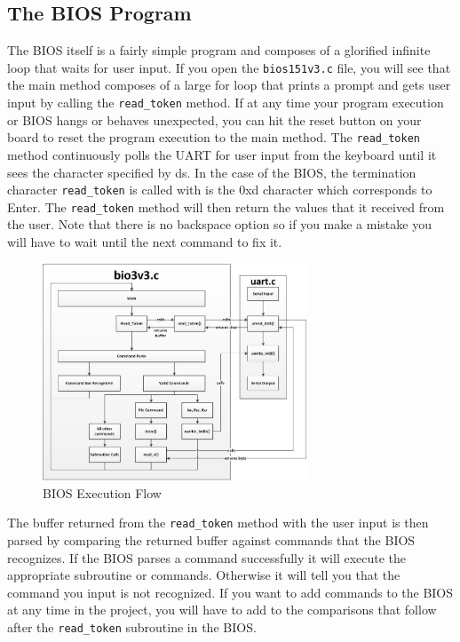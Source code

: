 \documentclass[11pt]{article}
\begin{document}
\begin{appendices}
\subsection{The BIOS Program}
The BIOS itself is a fairly simple program and composes of a glorified infinite loop that waits for
user input. If you open the \verb|bios151v3.c| file, you will see that the main method composes of a
large for loop that prints a prompt and gets user input by calling the \verb|read_token| method.
If at any time your program execution or BIOS hangs or behaves unexpected, you can hit the
reset button on your board to reset the program execution to the main method.
The \verb|read_token| method continuously polls the UART for user input from the keyboard until it
sees the character specified by ds. In the case of the BIOS, the termination character
\verb|read_token| is called with is the 0xd character which corresponds to Enter.
The \verb|read_token| method will then return the values that it received from the user. Note that
there is no backspace option so if you make a mistake you will have to wait until the next
command to fix it.

\begin{figure}[H]
  \centering
  \includegraphics[width=0.7\textwidth]{images/bios_flow.png}
  \caption{BIOS Execution Flow}
\end{figure}

The buffer returned from the \verb|read_token| method with the user input is then parsed by
comparing the returned buffer against commands that the BIOS recognizes. If the BIOS parses a
command successfully it will execute the appropriate subroutine or commands. Otherwise it
will tell you that the command you input is not recognized.
If you want to add commands to the BIOS at any time in the project, you will have to add to the
comparisons that follow after the \verb|read_token| subroutine in the BIOS.


\end{appendices}
\end{document}
